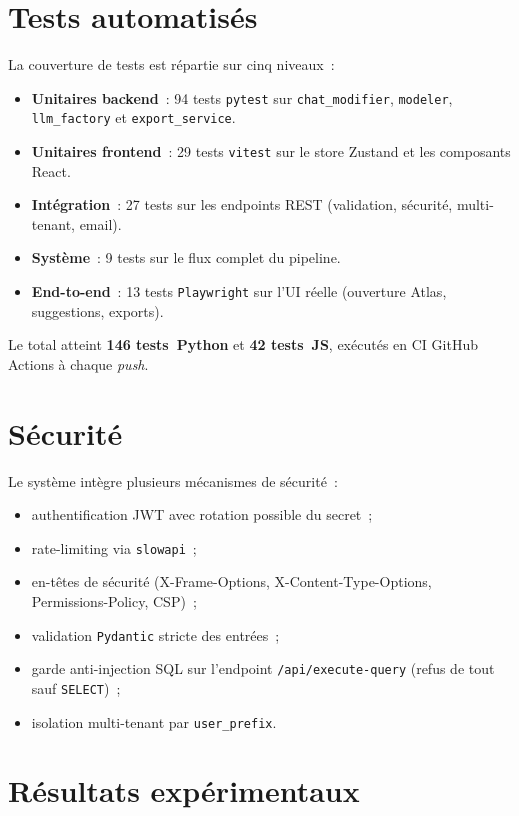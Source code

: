 \documentclass[12pt, a4paper]{report}
\begin{document}
\section{Tests automatisés}
La couverture de tests est répartie sur cinq niveaux~:
\begin{itemize}
  \item \textbf{Unitaires backend}~: 94 tests \texttt{pytest} sur
        \texttt{chat\_modifier}, \texttt{modeler}, \texttt{llm\_factory}
        et \texttt{export\_service}.
  \item \textbf{Unitaires frontend}~: 29 tests \texttt{vitest}
        sur le store Zustand et les composants React.
  \item \textbf{Intégration}~: 27 tests sur les endpoints REST
        (validation, sécurité, multi-tenant, email).
  \item \textbf{Système}~: 9 tests sur le flux complet du pipeline.
  \item \textbf{End-to-end}~: 13 tests \texttt{Playwright} sur l'UI
        réelle (ouverture Atlas, suggestions, exports).
\end{itemize}
Le total atteint \textbf{146 tests~Python} et \textbf{42 tests~JS},
exécutés en CI GitHub Actions à chaque \emph{push}.

\section{Sécurité}
Le système intègre plusieurs mécanismes de sécurité~:
\begin{itemize}
  \item authentification \ac{JWT} avec rotation possible du secret~;
  \item rate-limiting via \texttt{slowapi}~;
  \item en-têtes de sécurité (X-Frame-Options, X-Content-Type-Options,
        Permissions-Policy, CSP)~;
  \item validation \texttt{Pydantic} stricte des entrées~;
  \item garde anti-injection \ac{SQL} sur l'endpoint
        \texttt{/api/execute-query} (refus de tout sauf
        \texttt{SELECT})~;
  \item isolation multi-tenant par \texttt{user\_prefix}.
\end{itemize}

\section{Résultats expérimentaux}
\end{document}
